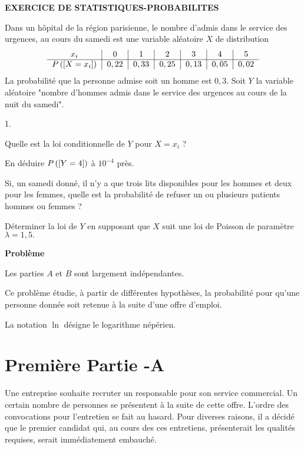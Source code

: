 \documentclass[11pt]{article}%
\begin{document}
\begin{center}
\textbf{EXERCICE DE STATISTIQUES-PROBABILITES}
\end{center}

Dans un hôpital de la région parisienne, le nombre d'admis dans le
service
des urgences, au cours du samedi est une variable aléatoire $X$ de
distribution
\[
\begin{tabular}{c|c|c|c|c|c|c}
$x_{i}$ & $0$ & $1$ & $2$ & $3$ & $4$ & $5$ \\
\hline
$P\left(\Ev{X = x_{i}}\right)$ & $0,22$ & $0,33$ & $0,25$ & $0,13$ &
$0,05$ & $0,02$\end{tabular}
\]
La probabilité que la personne admise soit un homme est $0,3.$ Soit $Y$
la
variable aléatoire "nombre d'hommes admis dans le service des urgences
au
cours de la nuit du samedi".

\begin{noliste}{1.}
 \setlength{\itemsep}{4mm}
\item Quelle est la loi conditionnelle de $Y$ pour $X = x_{i}$ ?

\item En déduire $P\left(\left[ {Y = 4} \right]\right)$ à $10^{-4}$ près.

\item Si, un samedi donné, il n'y a que trois lits disponibles pour les
hommes et deux pour les femmes, quelle est la probabilité de refuser un
ou
plusieurs patients hommes ou femmes ?

\item Déterminer la loi de $Y$ en supposant que $X$ suit une loi de
Poisson
de paramètre $\lambda = 1,5.$
\end{noliste}

\begin{center}
\textbf{Problème}
\end{center}

Les parties $A$ et $B$ sont largement indépendantes.

Ce problème étudie, à partir de différentes hypothèses, la probabilité
pour
qu'une personne donnée soit retenue à la suite d'une offre d'emploi.

La notation $\ln $ désigne le logarithme népérien.

\section*{Première Partie -A}

Une entreprise souhaite recruter un responsable pour son service
commercial.
Un certain nombre de personnes se présentent à la suite de cette offre.
L'ordre des convocations pour l'entretien se fait au hasard. Pour
diverses
raisons, il a décidé que le premier candidat qui, au cours des ces
entretiens, présenterait les qualités requises, serait immédiatement
embauché.
\end{document}
